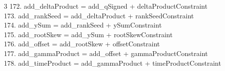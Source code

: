 \documentclass[10pt]{article}
\begin{document}
\begin{multicols}{3}
172. add\_deltaProduct = add\_qSigned + deltaProductConstraint\\
173. add\_rankSeed = add\_deltaProduct + rankSeedConstraint\\
174. add\_ySum = add\_rankSeed + ySumConstraint\\
175. add\_rootSkew = add\_ySum + rootSkewConstraint\\
176. add\_offset = add\_rootSkew + offsetConstraint\\
177. add\_gammaProduct = add\_offset + gammaProductConstraint\\
178. add\_timeProduct = add\_gammaProduct + timeProductConstraint\\
\end{multicols}
\end{document}
